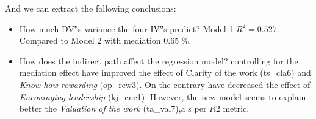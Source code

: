 \documentclass[
]{article}
\providecommand{\tightlist}{%
  \setlength{\itemsep}{0pt}\setlength{\parskip}{0pt}}
\begin{document}
And we can extract the following conclusions:

\begin{itemize}
\tightlist
\item
  How much DV‟s variance the four IV‟s predict? Model 1 \(R^2 = 0.527\).
  Compared to Model 2 with mediation 0.65 \%.
\item
  How does the indirect path affect the regression model? controlling
  for the mediation effect have improved the effect of Clarity of the
  work (ts\_cla6) and \emph{Know-how rewarding} (op\_rew3). On the
  contrary have decreased the effect of \emph{Encouraging leadership}
  (kj\_enc1). However, the new model seems to explain better the
  \emph{Valuation of the work} (ta\_val7),a s per \(R2\) metric.
\end{itemize}
\end{document}
